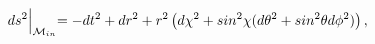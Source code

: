 \begin{equation}
\label{metric} ds^2\Bigl|_{{\cal M}_{in}}=-dt^2+
dr^2+r^2\left(d\chi^2+sin^2\chi (d\theta^2+ sin^2\theta
d\phi^2)\right),
\end{equation}

